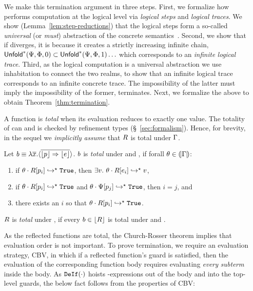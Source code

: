 %
We make this termination argument in three steps.
%
First, we formalize how \pbesym performs
computation at the logical level via
\emph{logical steps} and \emph{logical traces}.
We show (Lemma~\ref{lem:step-reductions})
that the logical steps form a so-called
\emph{universal} (or \emph{must})
abstraction of the concrete
semantics~\cite{CousotCousot77,CGL92}.
%
Second, we show that if \pbesym diverges,
it is because it creates a strictly
increasing infinite chain,
$\mathsf{Unfold}^{*}(\Psi,\Phi,0) \subset \mathsf{Unfold}^{*}(\Psi,\Phi,1) \ldots$
which corresponds to an \emph{infinite logical trace}.
%
Third, as the logical computation
is a universal abstraction we use
inhabitation to connect the two
realms, \ie to show that an
infinite logical trace
corresponds to an infinite
concrete trace.
%
The impossibility of the latter
must imply the impossibility of
the former, \ie \pbesym terminates.
Next, we formalize the above
to obtain Theorem~\ref{thm:termination}.




%
A function is \emph{total} when its evaluation
reduces to exactly one value.
%
The totality of \RRenv can and is checked
by refinement types (\S~\ref{sec:formalism}).
%
Hence, for brevity, in the sequel
we \emph{implicitly assume}
that $R$ is total under $\Gamma$.
%
\begin{definition}\label{asm:total}
Let $b \equiv \lambda \overline{x}. \langle \overline{\lfloor p\rfloor  \Rightarrow \lfloor e\rfloor } \rangle$.
$b$ is \emph{total} under \env and \RRenv, if
forall $\theta\in (\!|\Gamma|\!)$:
%
\begin{enumerate}
\item if ${\theta \cdot R [p_i]}\hookrightarrow^{\star}{\texttt{True}}$, then
$ \exists \val.\ \evalsto{{\apply{\store}{\refapply{\RRenv}{e_i}}}}{\val}$,
\item if ${\theta \cdot R [p_i]}\hookrightarrow^{\star}{\texttt{True}}$ and ${\theta \cdot \Psi [p_j]}\hookrightarrow^{\star}{\texttt{True}}$, then $i=j$, and
\item there exists an $i$ so that  ${\theta \cdot R [p_i]}\hookrightarrow^{\star}{\texttt{True}}$.
\end{enumerate}

$R$ is \emph{total} under \env,
if every $b \in \lfloor R\rfloor $
is total under \env and \RRenv.
%
\end{definition}

%
As the reflected functions are total,
the Church-Rosser theorem implies that
evaluation order is not important.
%
To prove termination, we require
an evaluation strategy, \eg CBV,
in which if a reflected
function's guard is satisfied,
then the evaluation of the
corresponding function body
requires evaluating
\emph{every subterm}
inside the body.
%
As $\texttt{DeIf}(\cdot)$ hoists
-expressions out
of the body and into the
top-level guards, the below
fact follows from the
properties of CBV:

